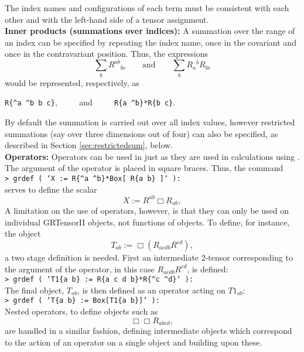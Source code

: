 \documentclass{article}
\begin{document}
The index names and configurations of each term must be 
consistent with each other and with the left-hand side of a tensor
assignment.\\

\noindent\textbf{Inner products (summations over indices):} A summation
over the range of an index can be specified by repeating the index
name, once in the covariant and once in the contravariant position.
Thus, the expressions
\[
  \sum_b R^{ab}{}_{bc} \qquad\text{and}\qquad \sum_b R_a{}^b R_{bc}
\]
would be represented, respectively, as

\begin{center}
  \texttt{R\{\^{}a \^{}b b c\}}, $\qquad$ and $\qquad$ 
  \texttt{R\{a \^{}b\}*R\{b c\}}.
\end{center}

By default the summation is carried out over all index values, however
restricted summations (say over three dimensions out of four) can also
be specified, as described in Section \ref{sec:restrictedsum},
below.\\

\noindent\textbf{Operators:} Operators can be used in 
just as they are used in calculations using . The
argument of the operator is placed in square braces. Thus, the
command\\

\noindent\texttt{> grdef ( `X := R\{\^{}a \^{}b\}*Box[ R\{a b\} ]` ):}\\

\noindent serves to define the scalar
\[
  X := R^{ab}\Box R_{ab},
\]
A limitation on the use of operators, however, is that they can only
be used on individual GRTensorII objects, not functions of objects.
To define, for instance, the object
\[
  T_{ab} := \Box (R_{acdb}R^{cd}),
\]
a two stage definition is needed. First an intermediate 2-tensor 
corresponding to the argument of the operator,
in this case $R_{acdb}R^{cd}$, is defined:\\

\noindent\texttt{> grdef ( `T1\{a b\} := R\{a c d b\}*R\{\^{}c \^{}d\}` ):}\\

\noindent The final object, $T_{ab}$, is then defined as an operator acting on
$T1_{ab}$:\\

\noindent\texttt{> grdef ( `T\{a b\} := Box[T1\{a b\}]` ):}\\

Nested operators, to define objects such as
\[
  \Box\Box R_{abcd},
\]
are handled in a similar fashion, defining intermediate
objects which correspond to the action of an operator on a single
object and building upon these.
\end{document}
